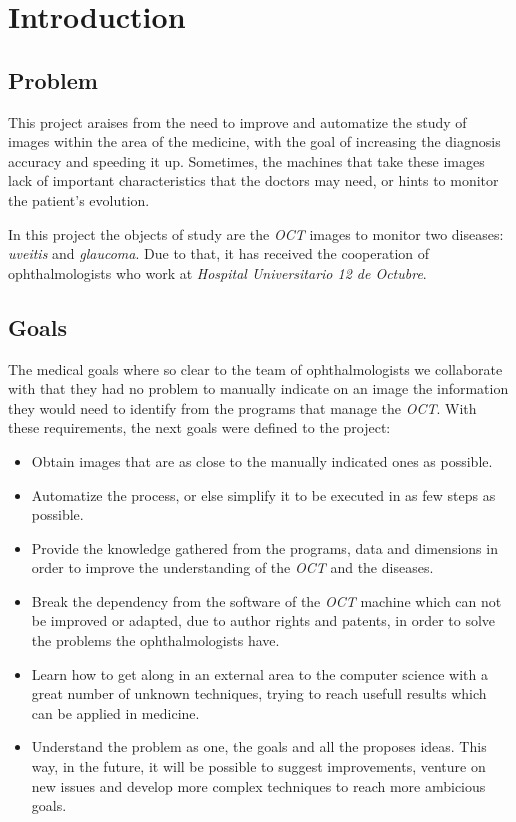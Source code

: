 \chapter{Introduction}
\section{Problem}
This project araises from the need to improve and automatize the
study of images within the area of the medicine, with the goal of 
increasing the diagnosis accuracy and speeding it up. Sometimes, the
machines that take these images lack of important characteristics 
that the doctors may need, or hints to monitor the patient's evolution.

In this project the objects of study are the \emph{OCT} images to monitor
two diseases: \emph{uveitis} and \emph{glaucoma}. Due to that,
it has received the cooperation of ophthalmologists who work at
\emph{Hospital Universitario 12 de Octubre}.

\section{Goals}
The medical goals where so clear to the team of ophthalmologists
we collaborate with that they had no problem to manually indicate on an
image the information they would need to identify from the programs that 
manage the \emph{OCT}. With these requirements, the next goals were defined
to the project:
\begin{itemize}
\item Obtain images that are as close to the manually indicated ones as possible.
\item Automatize the process, or else simplify it to be executed in as few steps as possible.
\item Provide the knowledge gathered from the programs, data and 
dimensions in order to improve the understanding of the \emph{OCT} and
the diseases.
\item Break the dependency from the software of the \emph{OCT} machine
which can not be improved or adapted, due to author rights and patents, 
in order to solve the problems the ophthalmologists have.
\item Learn how to get along in an external area to the computer science
with a great number of unknown techniques, trying to reach usefull 
results which can be applied in medicine.
\item Understand the problem as one, the goals and all the proposes ideas.
This way, in the future, it will be possible to suggest improvements, venture
on new issues and develop more complex techniques to reach more
ambicious goals.
\end{itemize}

